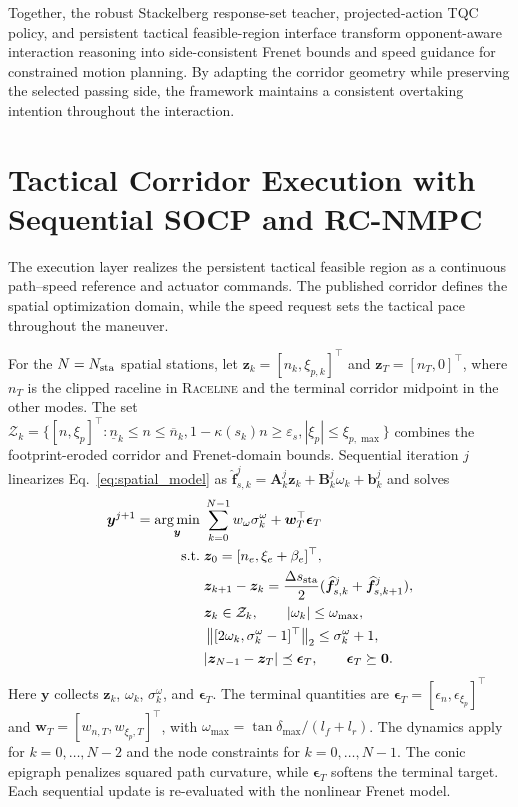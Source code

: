 \documentclass[journal,twoside,web]{ieeecolor}
\DeclareMathOperator*{\argmin}{arg\,min}
\begin{document}
Together, the robust Stackelberg response-set teacher, projected-action TQC
policy, and persistent tactical feasible-region interface transform
opponent-aware interaction reasoning into side-consistent Frenet bounds and
speed guidance for constrained motion planning. By adapting the corridor
geometry while preserving the selected passing side, the framework maintains
a consistent overtaking intention throughout the interaction.


\section{Tactical Corridor Execution with Sequential SOCP and \mbox{RC-NMPC}}
\label{sec:execution}\label{sec:planner}\label{sec:controller}

The execution layer realizes the persistent tactical feasible region as a
continuous path--speed reference and actuator commands. The published corridor
defines the spatial optimization domain, while the speed request sets the
tactical pace throughout the maneuver.

For the $N=N_{\rm sta}$ spatial stations, let
$\bm z_k=[n_k,\xi_{p,k}]^\top$ and $\bm z_T=[n_T,0]^\top$, where $n_T$ is the
clipped raceline in \textsc{Raceline} and the terminal corridor midpoint in
the other modes. The set
$\mathcal Z_k=\{[n,\xi_p]^\top:\underline n_k\le n\le\overline n_k,
1-\kappa(s_k)n\ge\varepsilon_s,|\xi_p|\le\xi_{p,\max}\}$
combines the footprint-eroded corridor and Frenet-domain bounds. Sequential
iteration $j$ linearizes Eq.~\eqref{eq:spatial_model} as
$\widehat{\bm f}_{s,k}^{j}=\bm A_k^j\bm z_k+\bm B_k^j\omega_k+\bm b_k^j$
and solves
\begin{equation}
\begin{aligned}
\bm y^{j+1}=\argmin_{\bm y}\;&
\sum_{k=0}^{N-1}w_\omega\sigma_k^\omega
+\bm w_T^\top\bm\epsilon_T\\
\mathrm{s.t.}\;&\bm z_0=[n_e,\xi_e+\beta_e]^\top,\\
&\bm z_{k+1}-\bm z_k=\frac{\Delta s_{\rm sta}}{2}
 (\widehat{\bm f}_{s,k}^{j}+\widehat{\bm f}_{s,k+1}^{j}),\\
&\bm z_k\in\mathcal Z_k,\qquad |\omega_k|\le\omega_{\max},\\
&\left\|[2\omega_k,\sigma_k^\omega-1]^\top\right\|_2
\le\sigma_k^\omega+1,\\
&|\bm z_{N-1}-\bm z_T|\preceq\bm\epsilon_T,\qquad
\bm\epsilon_T\succeq\bm0 .
\end{aligned}
\label{eq:execution_socp}
\end{equation}
Here $\bm y$ collects $\bm z_k$, $\omega_k$, $\sigma_k^\omega$, and
$\bm\epsilon_T$. The terminal quantities are
$\bm\epsilon_T=[\epsilon_n,\epsilon_{\xi_p}]^\top$ and
$\bm w_T=[w_{n,T},w_{\xi_p,T}]^\top$, with
$\omega_{\max}=\tan\delta_{\max}/(l_f+l_r)$. The dynamics apply for
$k=0,\ldots,N-2$ and the node constraints for $k=0,\ldots,N-1$. The conic
epigraph penalizes squared path curvature, while $\bm\epsilon_T$ softens the
terminal target. Each sequential update is re-evaluated with the nonlinear
Frenet model.
\end{document}
